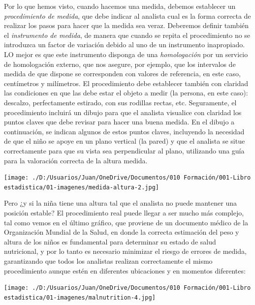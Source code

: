 \documentclass[
  letterpaper,
]{scrbook}
\begin{document}
Por lo que hemos visto, cuando hacemos una medida, debemos establecer un
\emph{procedimiento de medida}, que debe indicar al analista cual es la
forma correcta de realizar los pasos para hacer que la medida sea veraz.
Deberemos definir también el \emph{instrumento de medida}, de manera que
cuando se repita el procedimiento no se introduzca un factor de
variación debido al uno de un instrumento inapropiado. LO mejor es que
este instrumento disponga de una \emph{homologación} por un servicio de
homologación externo, que nos asegure, por ejemplo, que los intervalos
de medida de que dispone se corresponden con valores de referencia, en
este caso, centímetros y milímetros. El procedimiento debe establecer
también con claridad las condiciones en que las debe estar el objeto a
medir (la persona, en este caso): descalzo, perfectamente estirado, con
sus rodillas rectas, etc. Seguramente, el procedimiento incluirá un
dibujo para que el analista visualice con claridad los puntos claves que
debe revisar para hacer una buena medida. En el dibujo a continuación,
se indican algunos de estos puntos claves, incluyendo la necesidad de
que el niño se apoye en un plano vertical (la pared) y que el analista
se situe correctamente para que su vista sea perpendicular al plano,
utilizando una guía para la valoración correcta de la altura medida.

\begin{marginfigure}

{\centering \texttt{[image: ./D:/Usuarios/Juan/OneDrive/Documentos/010 Formación/001-Libro estadistica/01-imagenes/medida-altura-2.jpg]}

}

\end{marginfigure}

Pero ¿y si la niña tiene una altura tal que el analista no puede
mantener una posición estable? El procedimiento real puede llegar a ser
mucho más complejo, tal como vemos en el último gráfico, que proviene de
un documento médico de la Organización Mundial de la Salud, en donde la
correcta estimación del peso y altura de los niños es fundamental para
determinar su estado de salud nutricional, y por lo tanto es necesario
minimizar el riesgo de errores de medida, garantizando que todos los
analistas realizan correctamente el mismo procedimiento aunque estén en
diferentes ubicaciones y en momentos diferentes:

\begin{marginfigure}

{\centering \texttt{[image: ./D:/Usuarios/Juan/OneDrive/Documentos/010 Formación/001-Libro estadistica/01-imagenes/malnutrition-4.jpg]}

}

\end{marginfigure}
\end{document}
